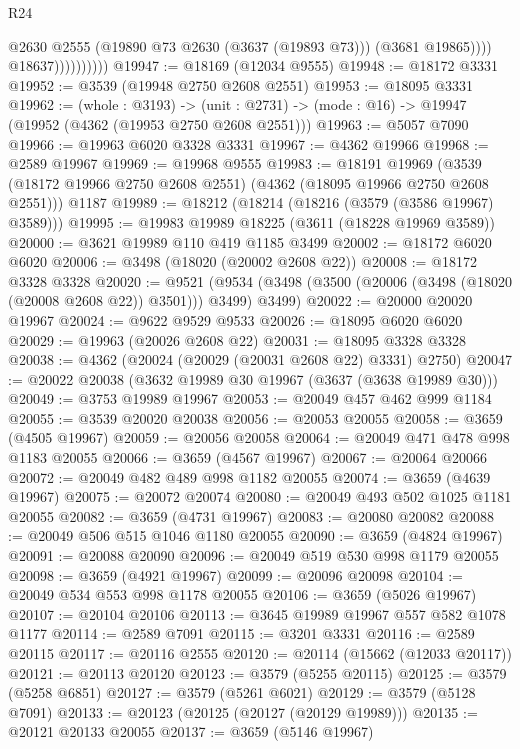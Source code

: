 \begin{lexlean}{R24}
\begin{coremodule}
                              @2630
                              @2555
                              (@19890 @73 @2630 (@3637 (@19893 @73)))
                              (@3681 @19865))))
                        @18637))))))))))
@19947 := @18169 (@12034 @9555)
@19948 := @18172 @3331
@19952 := @3539 (@19948 @2750 @2608 @2551)
@19953 := @18095 @3331
@19962 := (whole : @3193) ->
  (unit : @2731) -> (mode : @16) -> @19947 (@19952 (@4362 (@19953 @2750 @2608 @2551)))
@19963 := @5057 @7090
@19966 := @19963 @6020 @3328 @3331
@19967 := @4362 @19966
@19968 := @2589 @19967
@19969 := @19968 @9555
@19983 := @18191
    @19969
    (@3539 (@18172 @19966 @2750 @2608 @2551) (@4362 (@18095 @19966 @2750 @2608 @2551)))
    @1187
@19989 := @18212 (@18214 (@18216 (@3579 (@3586 @19967) @3589)))
@19995 := @19983 @19989 @18225 (@3611 (@18228 @19969 @3589))
@20000 := @3621 @19989 @110 @419 @1185 @3499
@20002 := @18172 @6020 @6020
@20006 := @3498 (@18020 (@20002 @2608 @22))
@20008 := @18172 @3328 @3328
@20020 := @9521
    (@9534 (@3498 (@3500 (@20006 (@3498 (@18020 (@20008 @2608 @22)) @3501))) @3499) @3499)
@20022 := @20000 @20020 @19967
@20024 := @9622 @9529 @9533
@20026 := @18095 @6020 @6020
@20029 := @19963 (@20026 @2608 @22)
@20031 := @18095 @3328 @3328
@20038 := @4362 (@20024 (@20029 (@20031 @2608 @22) @3331) @2750)
@20047 := @20022 @20038 (@3632 @19989 @30 @19967 (@3637 (@3638 @19989 @30)))
@20049 := @3753 @19989 @19967
@20053 := @20049 @457 @462 @999 @1184
@20055 := @3539 @20020 @20038
@20056 := @20053 @20055
@20058 := @3659 (@4505 @19967)
@20059 := @20056 @20058
@20064 := @20049 @471 @478 @998 @1183 @20055
@20066 := @3659 (@4567 @19967)
@20067 := @20064 @20066
@20072 := @20049 @482 @489 @998 @1182 @20055
@20074 := @3659 (@4639 @19967)
@20075 := @20072 @20074
@20080 := @20049 @493 @502 @1025 @1181 @20055
@20082 := @3659 (@4731 @19967)
@20083 := @20080 @20082
@20088 := @20049 @506 @515 @1046 @1180 @20055
@20090 := @3659 (@4824 @19967)
@20091 := @20088 @20090
@20096 := @20049 @519 @530 @998 @1179 @20055
@20098 := @3659 (@4921 @19967)
@20099 := @20096 @20098
@20104 := @20049 @534 @553 @998 @1178 @20055
@20106 := @3659 (@5026 @19967)
@20107 := @20104 @20106
@20113 := @3645 @19989 @19967 @557 @582 @1078 @1177
@20114 := @2589 @7091
@20115 := @3201 @3331
@20116 := @2589 @20115
@20117 := @20116 @2555
@20120 := @20114 (@15662 (@12033 @20117))
@20121 := @20113 @20120
@20123 := @3579 (@5255 @20115)
@20125 := @3579 (@5258 @6851)
@20127 := @3579 (@5261 @6021)
@20129 := @3579 (@5128 @7091)
@20133 := @20123 (@20125 (@20127 (@20129 @19989)))
@20135 := @20121 @20133 @20055
@20137 := @3659 (@5146 @19967)

\end{coremodule}
\end{lexlean}
